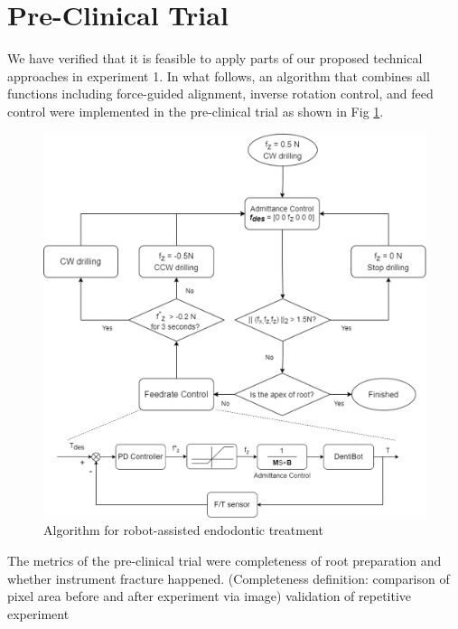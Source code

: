 \newpage

\section{Pre-Clinical Trial}
\hspace*{6mm}We have verified that it is feasible to apply parts of our proposed technical approaches in experiment 1. In what follows, an algorithm that combines all functions including force-guided alignment, inverse rotation control, and feed control were implemented in the pre-clinical trial as shown in Fig \ref{fig: exp2_motion planning}.
\begin{figure}[htbp]
\begin{center}
\includegraphics[width=1\linewidth]{Images/algorithm.png}
\end{center}
\caption{
Algorithm for robot-assisted endodontic treatment
}\label{fig: exp2_motion planning}
\end{figure}
\par
The metrics of the pre-clinical trial were completeness of root preparation and whether instrument fracture happened.
(Completeness definition: comparison of pixel area before and after experiment via image)
validation of repetitive experiment

